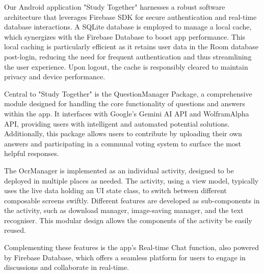 

Our Android application "Study Together" harnesses a robust software architecture that leverages Firebase SDK for secure authentication and real-time database interactions. A SQLite database is employed to manage a local cache, which synergizes with the Firebase Database to boost app performance. This local caching is particularly efficient as it retains user data in the Room database post-login, reducing the need for frequent authentication and thus streamlining the user experience. Upon logout, the cache is responsibly cleared to maintain privacy and device performance.

Central to "Study Together" is the QuestionManager Package, a comprehensive module designed for handling the core functionality of questions and answers within the app. It interfaces with Google's Gemini AI API and WolframAlpha API, providing users with intelligent and automated potential solutions. Additionally, this package allows users to contribute by uploading their own answers and participating in a communal voting system to surface the most helpful responses.


The OcrManager is implemented as an individual activity, designed to be deployed in multiple places as needed. The activity, using a view model, typically uses the live data holding an UI state class, to switch between different composable screens swiftly. Different features are developed as sub-components in the activity, such as download manager, image-saving manager, and the text recogniser. This modular design allows the components of the activity be easily reused.

Complementing these features is the app's Real-time Chat function, also powered by Firebase Database, which offers a seamless platform for users to engage in discussions and collaborate in real-time.

